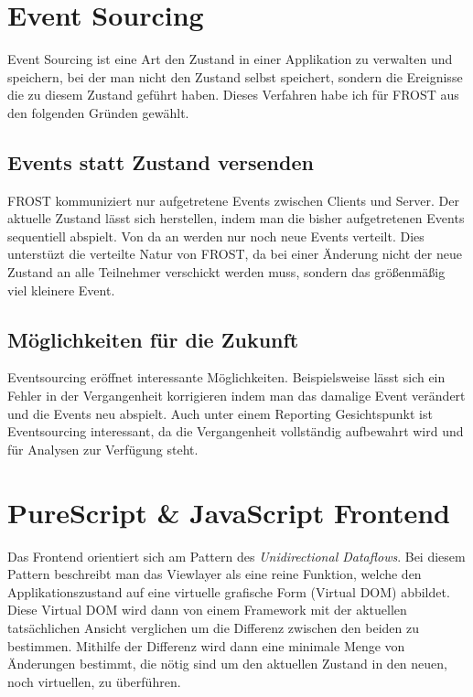 \section{Event Sourcing}
Event Sourcing ist eine Art den Zustand in einer Applikation zu verwalten und
speichern, bei der man nicht den Zustand selbst speichert, sondern die
Ereignisse die zu diesem Zustand geführt haben. Dieses Verfahren habe ich für
FROST aus den folgenden Gründen gewählt.

\subsection*{Events statt Zustand versenden}
FROST kommuniziert nur aufgetretene Events zwischen Clients und Server. Der
aktuelle Zustand lässt sich herstellen, indem man die bisher aufgetretenen
Events sequentiell abspielt. Von da an werden nur noch neue Events verteilt.
Dies unterstüzt die verteilte Natur von FROST, da bei einer Änderung nicht der
neue Zustand an alle Teilnehmer verschickt werden muss, sondern das größenmäßig
viel kleinere Event.

\subsection*{Möglichkeiten für die Zukunft}
Eventsourcing eröffnet interessante Möglichkeiten. Beispielsweise lässt sich ein
Fehler in der Vergangenheit korrigieren indem man das damalige Event verändert
und die Events neu abspielt. Auch unter einem Reporting Gesichtspunkt ist
Eventsourcing interessant, da die Vergangenheit vollständig aufbewahrt wird und
für Analysen zur Verfügung steht.


\section{PureScript \& JavaScript Frontend}
\label{sec:frontend}
Das Frontend orientiert sich am Pattern des \textit{Unidirectional Dataflows}.
Bei diesem Pattern beschreibt man das Viewlayer als eine reine Funktion, welche
den Applikationszustand auf eine virtuelle grafische Form (Virtual DOM)
abbildet. Diese Virtual DOM wird dann von einem Framework mit der aktuellen
tatsächlichen Ansicht verglichen um die Differenz zwischen den beiden zu
bestimmen. Mithilfe der Differenz wird dann eine minimale Menge von Änderungen
bestimmt, die nötig sind um den aktuellen Zustand in den neuen, noch
virtuellen, zu überführen.

